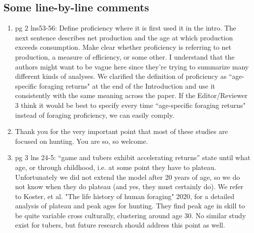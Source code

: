 \documentclass{article}
\newcommand{\rev}[1]{{\color{ForestGreen}#1}}
\begin{document}
\subsection{Some line-by-line comments}
\begin{enumerate}
    \item pg 2 lns53-56: Define proficiency where it is first used it in the intro. The next sentence describes net production and the age at which production exceeds consumption. Make clear whether proficiency is referring to net production, a measure of efficiency, or some other. I understand that the authors might want to be vague here since they’re trying to summarize many different kinds of analyses.
    \rev{We clarified the definition of proficiency as ``age-specific foraging returns" at the end of the Introduction and use it consistently with the same meaning across the paper. If the Editor/Reviewer 3 think it would be best to specify every time ``age-specific foraging returns" instead of foraging proficiency, we can easily comply.  }
    
    \item Thank you for the very important point that most of these studies are focused on hunting. 
    \rev{You are so, so welcome.}
    
    \item pg 3 lns 24-5: “game and tubers exhibit accelerating returns” state until what age, or through childhood, i.e. at some point they have to plateau.
    \rev{Unfortunately we did not extend the model after 20 years of age, so we do not know when they do plateau (and yes, they must certainly do). We refer to Koster, et al. "The life history of human foraging" 2020, for a detailed analysis of plateau and peak ages for hunting. They find peak age in skill to be quite variable cross culturally, clustering around age 30. No similar study exist for tubers, but future research should address this point as well.  }
    

\end{enumerate}
\end{document}

